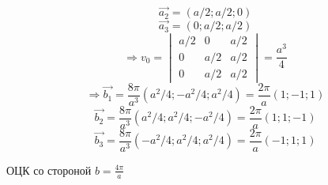\documentclass[12pt]{article}
\begin{document}
\begin{large}
\[
    \vec{a_2} = \left( a/2; a/2; 0 \right)
\]
\[
    \vec{a_3} = \left( 0; a/2; a/2 \right)
\]
\[
    \Rightarrow v_0 = \begin{vmatrix}
a/2 & 0 & a/2\\
0 & a/2 & a/2\\
0 & a/2 & a/2
\end{vmatrix} = \frac{a^3}{4}
\]
\[
    \Rightarrow \vec{b_1} = \frac{8\pi}{a^3}  \left( a^2/4; -a^2/4; a^2/4 \right) = \frac{2\pi}{a} \left( 1; -1; 1 \right)
\]
\[
    \vec{b_2} = \frac{8\pi}{a^3}  \left( a^2/4; a^2/4; -a^2/4 \right) = \frac{2\pi}{a} \left( 1; 1; -1 \right)
\]
\[
    \vec{b_3} = \frac{8\pi}{a^3}  \left( -a^2/4; a^2/4; a^2/4 \right) = \frac{2\pi}{a} \left( -1; 1; 1 \right)
\]
\par ОЦК со стороной $b = \frac{4\pi}{a}$

\par
\end{large}
\end{document}
